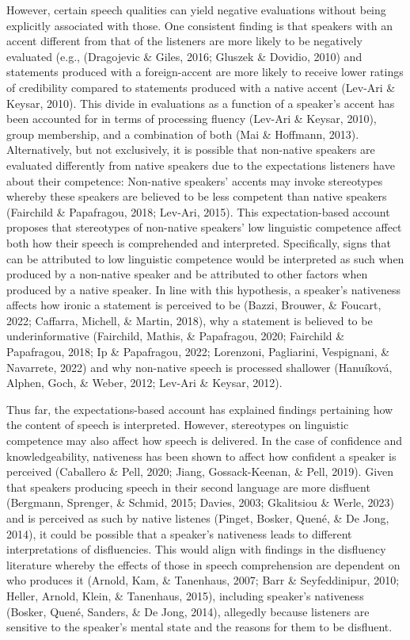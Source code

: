 \documentclass[
  man,floatsintext]{apa7}
\begin{document}
However, certain speech qualities can yield negative evaluations without being explicitly associated with those. One consistent finding is that speakers with an accent different from that of the listeners are more likely to be negatively evaluated (e.g., (Dragojevic \& Giles, 2016; Gluszek \& Dovidio, 2010) and statements produced with a foreign-accent are more likely to receive lower ratings of credibility compared to statements produced with a native accent (Lev-Ari \& Keysar, 2010). This divide in evaluations as a function of a speaker's accent has been accounted for in terms of processing fluency (Lev-Ari \& Keysar, 2010), group membership, and a combination of both (Mai \& Hoffmann, 2013). Alternatively, but not exclusively, it is possible that non-native speakers are evaluated differently from native speakers due to the expectations listeners have about their competence: Non-native speakers' accents may invoke stereotypes whereby these speakers are believed to be less competent than native speakers (Fairchild \& Papafragou, 2018; Lev-Ari, 2015). This expectation-based account proposes that stereotypes of non-native speakers' low linguistic competence affect both how their speech is comprehended and interpreted. Specifically, signs that can be attributed to low linguistic competence would be interpreted as such when produced by a non-native speaker and be attributed to other factors when produced by a native speaker. In line with this hypothesis, a speaker's nativeness affects how ironic a statement is perceived to be (Bazzi, Brouwer, \& Foucart, 2022; Caffarra, Michell, \& Martin, 2018), why a statement is believed to be underinformative (Fairchild, Mathis, \& Papafragou, 2020; Fairchild \& Papafragou, 2018; Ip \& Papafragou, 2022; Lorenzoni, Pagliarini, Vespignani, \& Navarrete, 2022) and why non-native speech is processed shallower (Hanuíková, Alphen, Goch, \& Weber, 2012; Lev-Ari \& Keysar, 2012).

Thus far, the expectations-based account has explained findings pertaining how the content of speech is interpreted. However, stereotypes on linguistic competence may also affect how speech is delivered. In the case of confidence and knowledgeability, nativeness has been shown to affect how confident a speaker is perceived (Caballero \& Pell, 2020; Jiang, Gossack-Keenan, \& Pell, 2019). Given that speakers producing speech in their second language are more disfluent (Bergmann, Sprenger, \& Schmid, 2015; Davies, 2003; Gkalitsiou \& Werle, 2023) and is perceived as such by native listenes (Pinget, Bosker, Quené, \& De Jong, 2014), it could be possible that a speaker's nativeness leads to different interpretations of disfluencies. This would align with findings in the disfluency literature whereby the effects of those in speech comprehension are dependent on who produces it (Arnold, Kam, \& Tanenhaus, 2007; Barr \& Seyfeddinipur, 2010; Heller, Arnold, Klein, \& Tanenhaus, 2015), including speaker's nativeness (Bosker, Quené, Sanders, \& De Jong, 2014), allegedly because listeners are sensitive to the speaker's mental state and the reasons for them to be disfluent.
\end{document}
